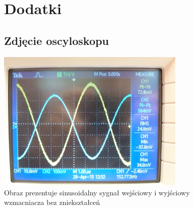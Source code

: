 \documentclass[a4paper,12pt]{article}
\begin{document}



\begin{figure}[h!]
\section{Dodatki}
\subsection{Zdjęcie oscyloskopu}
  \begin{center}
  \includegraphics[width=0.8\textwidth]{zdj.jpg}
  \caption{Obraz prezentuje sinusoidalny sygnał wejściowy i wyjściowy wzmacniacza bez zniekształceń }
  \end{center}
  \end{figure}
\end{document}
